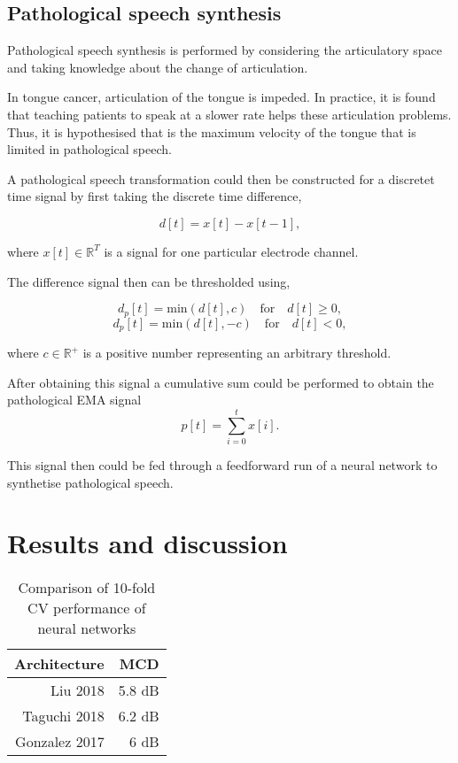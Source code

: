 \documentclass[a4paper]{article}
\begin{document}
\subsection{Pathological speech synthesis}

Pathological speech synthesis is performed by considering the articulatory
space and taking knowledge about the change of articulation.

In tongue cancer, articulation of the tongue is impeded. In practice,
it is found that teaching patients to speak at a slower rate helps these
articulation problems. Thus, it is hypothesised that is the maximum
velocity of the tongue that is limited in pathological speech.

A pathological speech transformation could then be constructed for
a discretet time signal by first taking the discrete time difference,

\begin{equation}
  d[t] = x[t] - x[t-1],
  \label{eq1}
\end{equation}

where \( x[t] \in \mathbb{R}^T \) is a signal for one particular electrode channel.

The difference signal then can be thresholded using,

\begin{equation}
  d_p[t] = \text{min}(d[t],c) \quad \text{for} \quad d[t] \geq 0, 
  \label{eq2}
\end{equation}
\begin{equation}
  d_p[t] = \text{min}(d[t],-c) \quad \text{for} \quad d[t] < 0,
  \label{eq3}
\end{equation}

where \( c \in \mathbb{R}^{+} \) is a positive number representing an
arbitrary threshold.

After obtaining this signal a cumulative sum could be performed to obtain
the pathological EMA signal
\begin{equation}
  p[t] = \sum_{i=0}^{t} x[i].
  \label{eq4}
\end{equation}

This signal then could be fed through a feedforward run of a neural network
to synthetise pathological speech.

\section{Results and discussion}
\begin{table}[th]
  \caption{Comparison of 10-fold CV performance of neural networks}
  \label{tab:example}
  \centering
  \begin{tabular}{ r r }
    \toprule
    \textbf{Architecture} & \textbf{MCD} \\
    \midrule
    Liu 2018 & 5.8 dB \\
    Taguchi 2018 & 6.2 dB               \\
    Gonzalez 2017 & 6 dB               \\
    \bottomrule
  \end{tabular}
  
\end{table}
\end{document}
